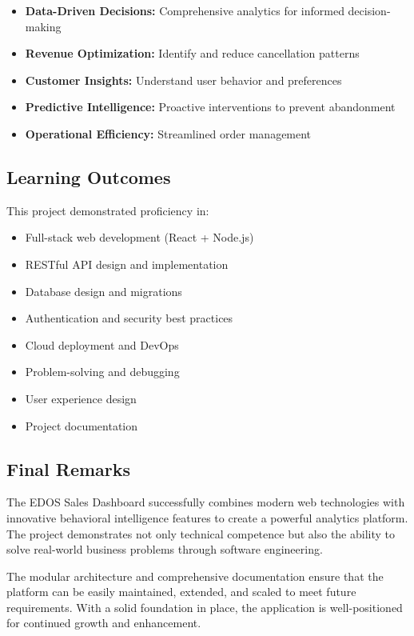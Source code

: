 \documentclass[12pt,a4paper]{article}
\begin{document}
\begin{itemize}[leftmargin=*]
    \item \textbf{Data-Driven Decisions:} Comprehensive analytics for informed decision-making
    \item \textbf{Revenue Optimization:} Identify and reduce cancellation patterns
    \item \textbf{Customer Insights:} Understand user behavior and preferences
    \item \textbf{Predictive Intelligence:} Proactive interventions to prevent abandonment
    \item \textbf{Operational Efficiency:} Streamlined order management
\end{itemize}

\subsection{Learning Outcomes}

This project demonstrated proficiency in:

\begin{itemize}[leftmargin=*]
    \item Full-stack web development (React + Node.js)
    \item RESTful API design and implementation
    \item Database design and migrations
    \item Authentication and security best practices
    \item Cloud deployment and DevOps
    \item Problem-solving and debugging
    \item User experience design
    \item Project documentation
\end{itemize}

\subsection{Final Remarks}

The EDOS Sales Dashboard successfully combines modern web technologies with innovative behavioral intelligence features to create a powerful analytics platform. The project demonstrates not only technical competence but also the ability to solve real-world business problems through software engineering.

The modular architecture and comprehensive documentation ensure that the platform can be easily maintained, extended, and scaled to meet future requirements. With a solid foundation in place, the application is well-positioned for continued growth and enhancement.
\end{document}
